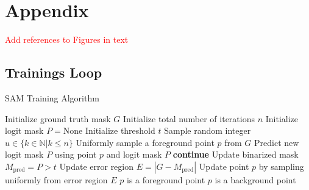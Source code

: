 \section{Appendix}
\textcolor{red}{Add references to Figures in text}

\subsection{Trainings Loop}\label{pcsam}
\begin{algorithm}
	\caption{SAM Training Algorithm}
	\begin{algorithmic}[1]
		\State Initialize ground truth mask $G$
		\State Initialize total number of iterations $n$
		\State Initialize logit mask $ P = \text{None}$
		\State Initialize threshold $t$
		\State Sample random integer $u\in \{k \in \mathbb{N}|k\leq n\}$
		\State Uniformly sample a foreground point $p$ from $G$
		\State Predict new logit mask $P$ using point $p$ and logit mask $P$
		\State \textbf{continue}
		\EndIf
		\State Update binarized mask $M_{\text{pred}} = P > t$ 
		\State Update error region $E = |G - M_{\text{pred}}|$
		\State Update point $p$ by sampling uniformly from error region $E$
		\State $p$ is a foreground point
		\State $p$ is a background point
		\EndIf
		\EndFor
	\end{algorithmic}
\end{algorithm}
